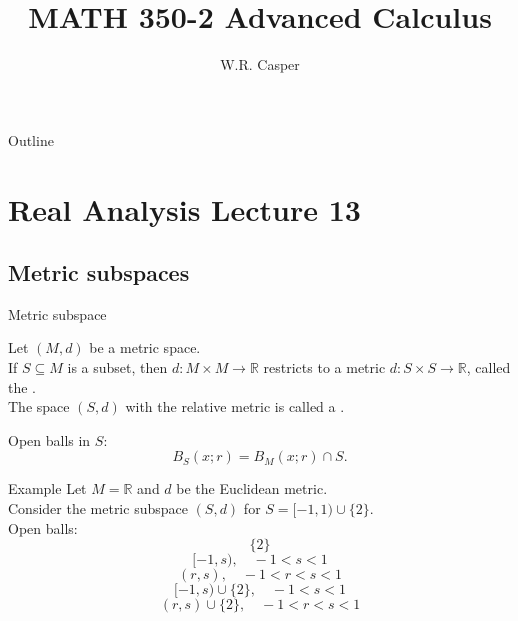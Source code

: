 \documentclass{beamer}
\title{MATH 350-2 Advanced Calculus}
\subtitle
{} %
\author[W.R. Casper] %
{W.R. Casper}
\institute[California State University Fullerton] %
{
  Department of Mathematics\\
  California State University Fullerton}
\begin{document}
\begin{frame}
  \titlepage
\end{frame}

\begin{frame}{Outline}
  \tableofcontents
\end{frame}



\section{Real Analysis Lecture 13}
\subsection{Metric subspaces}

\begin{frame}{Metric subspace}
\begin{defn}
Let $(M,d)$ be a metric space.\\
\pause
If $S\subseteq M$ is a subset, then $d: M\times M\rightarrow \mathbb{R}$ restricts to a metric $d: S\times S\rightarrow \mathbb{R}$, called the .\\
\pause
The space $(S,d)$ with the relative metric is called a .
\end{defn}
\pause
Open balls in $S$:
$$B_S(x; r) = B_M(x; r) \cap S.$$
\end{frame}

\begin{frame}{Example}
Let $M=\mathbb{R}$ and $d$ be the Euclidean metric.\\
\pause
Consider the metric subspace $(S,d)$ for $S = [-1,1)\cup \{2\}$.\\
\pause
Open balls:
\pause
$$\{2\}$$
\pause
$$[-1,s),\quad -1 < s < 1$$
\pause
$$(r,s),\quad -1 < r < s < 1$$
\pause
$$[-1,s)\cup\{2\},\quad -1 < s < 1$$
\pause
$$(r,s)\cup\{2\},\quad -1 < r < s < 1$$
\end{frame}
\end{document}
